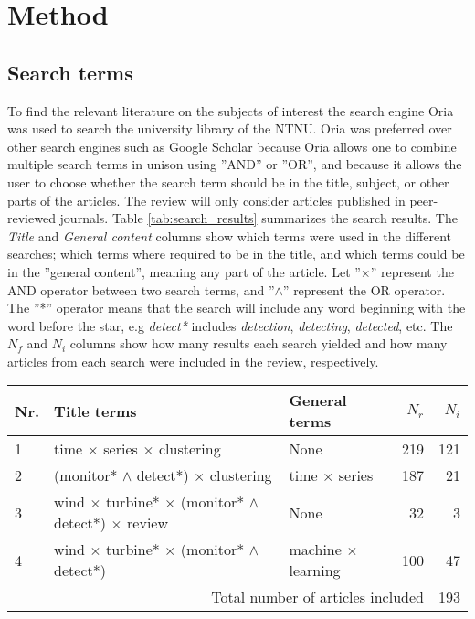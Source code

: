 \newpage
\chapter{Method}

\section{Search terms}
To find the relevant literature on the subjects of interest the search engine Oria was used to search the university library of the NTNU. Oria was preferred over other search engines such as Google Scholar because Oria allows one to combine multiple search terms in unison using ''AND'' or ''OR'', and because it allows the user to choose whether the search term should be in the title, subject, or other parts of the articles. The review will only consider articles published in peer-reviewed journals. Table \ref{tab:search_results} summarizes the search results. The \textit{Title} and \textit{General content} columns show which terms were used in the different searches; which terms where required to be in the title, and which terms could be in the ''general content'', meaning any part of the article. Let ''$\times$'' represent the AND operator between two search terms, and ''$\wedge$'' represent the OR operator. The ''*'' operator means that the search will include any word beginning with the word before the star, e.g \textit{detect*} includes \textit{detection}, \textit{detecting}, \textit{detected}, etc. The $N_f$ and $N_i$ columns show how many results each search yielded and how many articles from each search were included in the review, respectively. \bigskip 

\begin{table*}[h]
    \centering
    \begin{tabular}{ lllrr } 
        \toprule
        Nr. & Title terms & General terms & $N_r$ & $N_i$ \\
        \midrule
        1 & time $\times$ series $\times$ clustering & None & 219 & 121 \\ 
        2 & (monitor* $\wedge{}$ detect*) $\times$ clustering & time $\times$ series & 187 & 21 \\
        3 & wind $\times$ turbine* $\times$ (monitor* $\wedge{}$ detect*) $\times$ review & None & 32 & 3 \\
        4 & wind $\times$ turbine* $\times$ (monitor* $\wedge{}$ detect*) & machine $\times$ learning & 100 & 47 \\ 
        \midrule
        \multicolumn{4}{r}{Total number of articles included} & 193 \\
        \bottomrule
    \end{tabular}
    \caption{Search results}
    \label{tab:search_results}
\end{table*}


